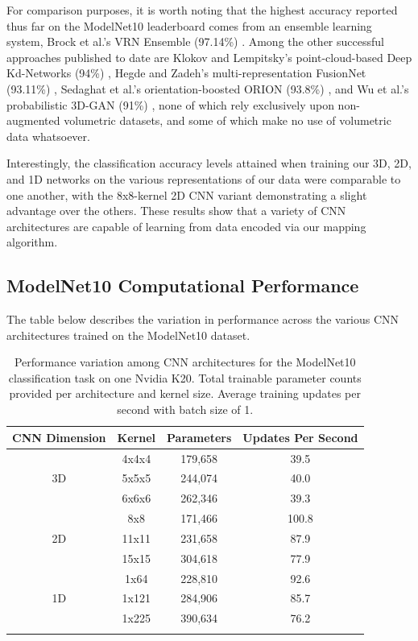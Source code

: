 \documentclass{article}
\begin{document}
For comparison purposes, it is worth noting that the highest accuracy reported thus far on the ModelNet10 leaderboard comes from an ensemble learning system, Brock et al.'s VRN Ensemble (97.14\%) \cite{VRN_ENSEMBLE}. Among the other successful approaches published to date are Klokov and Lempitsky's point-cloud-based Deep Kd-Networks (94\%) \cite{DBLP:journals/corr/KlokovL17}, Hegde and Zadeh's multi-representation FusionNet (93.11\%) \cite{2016arXiv160705695H}, Sedaghat et al.'s orientation-boosted ORION (93.8\%) \cite{DBLP:journals/corr/AlvarZB16}, and Wu et al.'s probabilistic 3D-GAN (91\%) \cite{2016arXiv161007584W}, none of which rely exclusively upon non-augmented volumetric datasets, and some of which make no use of volumetric data whatsoever. 

Interestingly, the classification accuracy levels attained when training our 3D, 2D, and 1D networks on the various representations of our data were comparable to one another, with the 8x8-kernel 2D CNN variant demonstrating a slight advantage over the others. These results show that a variety of CNN architectures are capable of learning from data encoded via our mapping algorithm.

\subsection{ModelNet10 Computational Performance}

The table below describes the variation in performance across the various CNN architectures trained on the ModelNet10 dataset.

\begin{table}[h]
\centering
\begin{tabular}[t]{cccc}
\toprule
CNN Dimension & Kernel & Parameters & Updates Per Second \\
\midrule
 & 4x4x4 & 179,658 & 39.5 \\

3D & 5x5x5 & 244,074 & 40.0 \\

 & 6x6x6 & 262,346 & 39.3 \\
\midrule
 & 8x8 & 171,466 & 100.8 \\

2D & 11x11 & 231,658 & 87.9 \\

 & 15x15 & 304,618 & 77.9 \\
\midrule
 & 1x64 & 228,810 & 92.6 \\

1D & 1x121 & 284,906 & 85.7 \\

 & 1x225 & 390,634 & 76.2 \\
\bottomrule \\
\end{tabular}
\caption{Performance variation among CNN architectures for the ModelNet10 classification task on one Nvidia K20. Total trainable parameter counts provided per architecture and kernel size. Average training updates per second with batch size of 1.}
\label{table:3}
\end{table}
\end{document}
